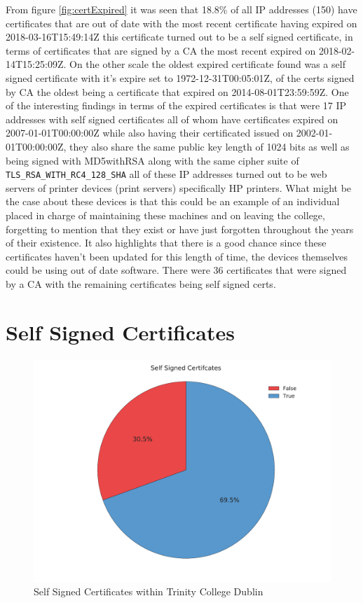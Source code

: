 \documentclass[a4wide,leqno,12pt]{report}
\begin{document}
From figure \ref{fig:certExpired} it was seen that 18.8\% of all IP addresses (150) have certificates that are out of date with the most recent certificate having expired on 2018-03-16T15:49:14Z this certificate turned out to be a self signed certificate, in terms of certificates that are signed by a CA the most recent expired on 2018-02-14T15:25:09Z. On the other scale the oldest expired certificate found was a self signed certificate with it's expire set to 1972-12-31T00:05:01Z, of the certs signed by CA the oldest being a certificate that expired on 2014-08-01T23:59:59Z. One of the interesting findings in terms of the expired certificates is that were 17 IP addresses with self signed certificates all of whom have certificates expired on 2007-01-01T00:00:00Z while also having their certificated issued on 2002-01-01T00:00:00Z, they also share the same public key length of 1024 bits as well as being signed with MD5withRSA along with the same cipher suite of \texttt{TLS\_RSA\_WITH\_RC4\_128\_SHA} all of these IP addresses turned out to be web servers of printer devices (print servers) specifically HP printers. What might be the case about these devices is that this could be an example of an individual placed in charge of maintaining these machines and on leaving the college, forgetting to mention that they exist or have just  forgotten throughout the years of their existence. It also highlights that there is a good chance since these certificates haven't been updated for this length of time, the devices themselves could be using out of date software. There were 36 certificates that were signed by a CA with the remaining certificates being self signed certs.

\section{Self Signed Certificates}
\begin{figure}[H]
\centering
\includegraphics[scale=.45]{pdf_images/SelfSigned}
\caption{Self Signed Certificates within Trinity College Dublin}
\label{fig:selfSigned}
\end{figure}
\end{document}

